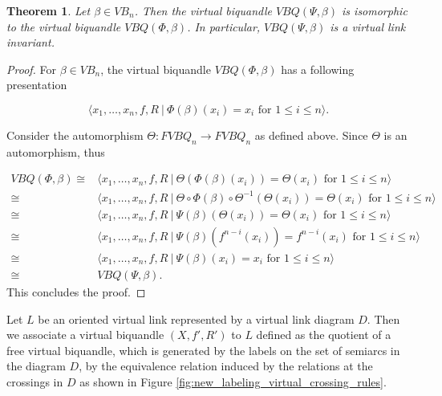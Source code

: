 \documentclass[11pt, reqno]{amsart}
\newtheorem{theorem}{Theorem}[section]
\theoremstyle{definition}
\begin{document}
\begin{theorem}\label{thm:both_virtual_biquandles_are_same}
Let $\beta \in VB_n$. Then the virtual biquandle $VBQ(\Psi,\beta)$ is isomorphic to the virtual biquandle $VBQ(\Phi,\beta)$. In particular, $VBQ(\Psi,\beta)$ is a virtual link invariant.
\end{theorem}
\begin{proof}
For $\beta \in VB_n$, the virtual biquandle $VBQ(\Phi,\beta)$ has a following presentation

$$
\langle x_1, \ldots, x_n, f,R~|~\Phi(\beta)(x_i)=x_i \textrm{ for } 1 \leq i \leq n \rangle.
$$

Consider the automorphism $\Theta: FVBQ_n \to FVBQ_n$ as defined above. Since $\Theta$ is an automorphism, thus

\begin{align*}
VBQ(\Phi,\beta)\cong &\langle x_1, \ldots, x_n,f, R~|~\Theta(\Phi(\beta)(x_i))=\Theta(x_i) \textrm{ for } 1 \leq i \leq n \rangle\\
\cong & \langle x_1, \ldots, x_n,f, R~|~\Theta\circ\Phi(\beta)\circ\Theta^{-1}(\Theta(x_i))=\Theta(x_i) \textrm{ for } 1 \leq i \leq n \rangle\\
\cong & \langle x_1, \ldots, x_n,f, R~|~\Psi(\beta)(\Theta(x_i))=\Theta(x_i) \textrm{ for } 1 \leq i \leq n \rangle\\
\cong & \langle x_1, \ldots, x_n,f, R~|~\Psi(\beta)(f^{n-i}(x_i))=f^{n-i}(x_i) \textrm{ for } 1 \leq i \leq n \rangle\\
\cong & \langle x_1, \ldots, x_n,f, R~|~\Psi(\beta)(x_i)=x_i \textrm{ for } 1 \leq i \leq n \rangle\\
\cong &VBQ(\Psi, \beta).
\end{align*}
This concludes the proof.
\end{proof}

Let $L$ be an oriented virtual link represented by a virtual link diagram $D$. Then we associate a virtual biquandle $(X, f', R')$ to $L$ defined as the quotient of a free virtual biquandle, which is generated by the labels on the set of semiarcs in the diagram $D$, by the equivalence relation induced by the relations at the crossings in $D$ as shown in Figure \ref{fig:new_labeling_virtual_crossing_rules}.
\end{document}
